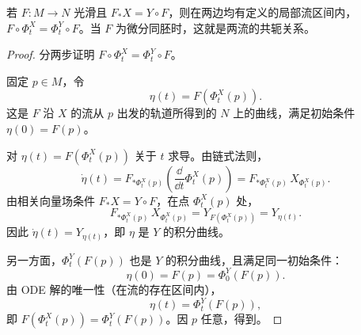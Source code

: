\begin{proposition}[相关向量场的流]
若 $F:M\to N$ 光滑且 $F_*X=Y\circ F$，则在两边均有定义的局部流区间内，$F\circ\Phi_t^X=\Phi_t^Y\circ F$。当 $F$ 为微分同胚时，这就是两流的共轭关系。
\end{proposition}
\begin{proof}
分两步证明 $F\circ\Phi_t^X=\Phi_t^Y\circ F$。

固定 $p\in M$，令
\[
 \eta(t)=F(\Phi_t^X(p)).
\]
这是 $F$ 沿 $X$ 的流从 $p$ 出发的轨道所得到的 $N$ 上的曲线，满足初始条件 $\eta(0)=F(p)$。

对 $\eta(t)=F(\Phi_t^X(p))$ 关于 $t$ 求导。由链式法则，
\[
 \dot\eta(t)
 =F_{*\Phi_t^X(p)}\!\left(\frac{\dd}{\dd t}\Phi_t^X(p)\right)
 =F_{*\Phi_t^X(p)}\,X_{\Phi_t^X(p)}.
\]
由相关向量场条件 $F_*X=Y\circ F$，在点 $\Phi_t^X(p)$ 处，
\[
 F_{*\Phi_t^X(p)}\,X_{\Phi_t^X(p)}
 =Y_{F(\Phi_t^X(p))}
 =Y_{\eta(t)}.
\]
因此 $\dot\eta(t)=Y_{\eta(t)}$，即 $\eta$ 是 $Y$ 的积分曲线。

另一方面，$\Phi_t^Y(F(p))$ 也是 $Y$ 的积分曲线，且满足同一初始条件：
\[
 \eta(0)=F(p)=\Phi_0^Y(F(p)).
\]
由 ODE 解的唯一性（在流的存在区间内），
\[
 \eta(t)=\Phi_t^Y(F(p)),
\]
即 $F(\Phi_t^X(p))=\Phi_t^Y(F(p))$。因 $p$ 任意，得到。
\end{proof}

